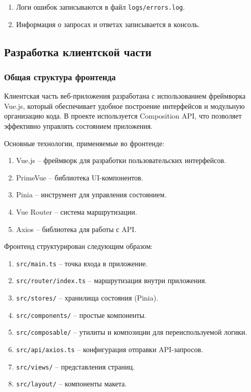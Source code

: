 \begin{enumerate}
    \item Логи ошибок записываются в файл \texttt{logs/errors.log}.
    \item Информация о запросах и ответах записывается в консоль.
\end{enumerate}

\subsection{Разработка клиентской части}

\subsubsection{Общая структура фронтенда}

Клиентская часть веб-приложения разработана с использованием фреймворка Vue.js, который обеспечивает удобное построение интерфейсов и модульную организацию кода. В проекте используется Composition API, что позволяет эффективно управлять состоянием приложения.

Основные технологии, применяемые во фронтенде:
\begin{enumerate}
    \item Vue.js -- фреймворк для разработки пользовательских интерфейсов.
    \item PrimeVue -- библиотека UI-компонентов.
    \item Pinia -- инструмент для управления состоянием.
    \item Vue Router -- система маршрутизации.
    \item Axios -- библиотека для работы с API.
\end{enumerate}

Фронтенд структурирован следующим образом:
\begin{enumerate}
    \item \texttt{src/main.ts} -- точка входа в приложение.
    \item \texttt{src/router/index.ts} -- маршрутизация внутри приложения.
    \item \texttt{src/stores/} -- хранилища состояния (Pinia).
    \item \texttt{src/components/} -- простые компоненты.
    \item \texttt{src/composable/} -- утилиты и композиции для переиспользуемой логики.
    \item \texttt{src/api/axios.ts} -- конфигурация отправки API-запросов.
    \item \texttt{src/views/} -- представления страниц.
    \item \texttt{src/layout/} -- компоненты макета.
\end{enumerate}

